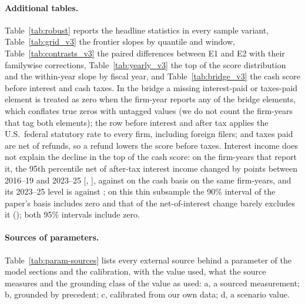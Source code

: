 \paragraph{Additional tables.}\label{app:data-additional} Table~\ref{tab:robust} reports the headline statistics in every sample variant, Table~\ref{tab:grid_v3} the frontier slopes by quantile and window, Table~\ref{tab:contrasts_v3} the paired differences between E1 and E2 with their familywise corrections, Table~\ref{tab:yearly_v3} the top of the score distribution and the within-year slope by fiscal year, and Table~\ref{tab:bridge_v3} the cash score before interest and cash taxes. In the bridge a missing interest-paid or taxes-paid element is treated as zero when the firm-year reports any of the bridge elements, which conflates true zeros with untagged values (we do not count the firm-years that tag both elements); the row before interest and after tax applies the U.S.\ federal statutory rate to every firm, including foreign filers; and taxes paid are net of refunds, so a refund lowers the score before taxes. Interest income does not explain the decline in the top of the cash score: on the \BridgeNBni{} firm-years that report it, the 95th percentile net of after-tax interest income changed by \BridgeChangeBni{} points between 2016--19 and 2023--25 [\BridgeChangeBniLo, \BridgeChangeBniHi], against \BridgeChangeBnis{} on the cash basis on the same firm-years, and its 2023--25 level is \BridgeLateBni{} against \BridgeLateBnis; on this thin subsample the 90\% interval of the paper's basis includes zero and that of the net-of-interest change barely excludes it (\BridgeChangeBniHi); both 95\% intervals include zero.






\clearpage

\paragraph{Sources of parameters.} Table~\ref{tab:param-sources} lists every external source behind a parameter of the model sections and the calibration, with the value used, what the source measures and the grounding class of the value as used: a, a sourced measurement; b, grounded by precedent; c, calibrated from our own data; d, a scenario value.



